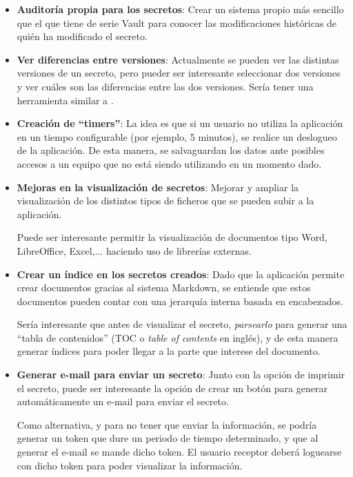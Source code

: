 \documentclass{\ClassPath/viu-tfm-template}
\begin{document}
\begin{itemize}
    \item \textbf{Auditoría propia para los secretos}: Crear un sistema propio más sencillo que el que tiene de serie Vault para conocer las modificaciones históricas de quién ha modificado el secreto.

    \item \textbf{Ver diferencias entre versiones}: Actualmente se pueden ver las distintas versiones de un secreto, pero pueder ser interesante seleccionar dos versiones y ver cuáles son las diferencias entre las dos versiones. Sería tener una herramienta similar a .

    \item \textbf{Creación de “timers”}: La idea es que si un usuario no utiliza la aplicación en un tiempo configurable (por ejemplo, 5 minutos), se realice un deslogueo de la aplicación. De esta manera, se salvaguardan los datos ante posibles accesos a un equipo que no está siendo utilizando en un momento dado.

    \item \textbf{Mejoras en la visualización de secretos}: Mejorar y ampliar la visualización de los distintos tipos de ficheros que se pueden subir a la aplicación.

    Puede ser interesante permitir la visualización de documentos tipo Word, LibreOffice, Excel,... haciendo uso de librerías externas.

    \item \textbf{Crear un índice en los secretos creados}: Dado que la aplicación permite crear documentos gracias al sistema Markdown, se entiende que estos documentos pueden contar con una jerarquía interna basada en encabezados.

    Sería interesante que antes de visualizar el secreto, \textit{parsearlo} para generar una “tabla de contenidos” (TOC o \textit{table of contents} en inglés), y de esta manera generar índices para poder llegar a la parte que interese del documento.

    \item \textbf{Generar e-mail para enviar un secreto}: Junto con la opción de imprimir el secreto, puede ser interesante la opción de crear un botón para generar automáticamente un e-mail para enviar el secreto.

    Como alternativa, y para no tener que enviar la información, se podría generar un token que dure un periodo de tiempo determinado, y que al generar el e-mail se mande dicho token. El usuario receptor deberá loguearse con dicho token para poder visualizar la información.
\end{itemize}
\end{document}
